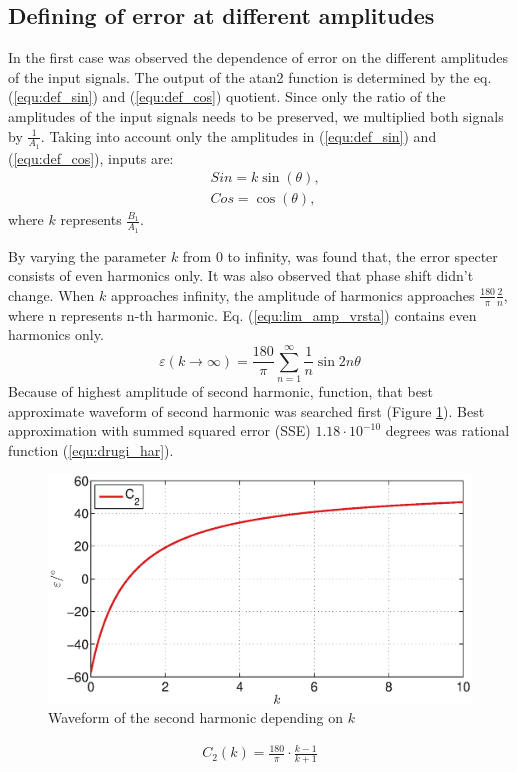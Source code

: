\documentclass[a4paper]{article}
\begin{document}
\subsection{Defining of error at different amplitudes}
In the first case was observed the dependence of error on the different amplitudes of the input signals. The output of the atan2 function is determined by the eq. (\ref{equ:def_sin}) and (\ref{equ:def_cos}) quotient. Since only the ratio of the amplitudes of the input signals needs to be preserved, we multiplied both signals by $\frac{1}{A_1}$. Taking into account only the amplitudes in (\ref{equ:def_sin}) and (\ref{equ:def_cos}), inputs are:
	\begin{eqnarray}
	\label{equ:def_sin_ama}
	&Sin = k \sin(\theta),\\
	\label{equ:def_cos_amp}
	&Cos =\cos(\theta),
	\end{eqnarray}
where $k$ represents $\frac{B_1}{A_1}$.

By varying the parameter $k$ from 0 to infinity, was found that, the error specter consists of even harmonics only. It was also observed that phase shift didn't change. When $k$ approaches infinity, the amplitude of harmonics approaches $\frac{180}{\pi}\frac{2}{n}$, where n represents n-th harmonic. Eq. (\ref{equ:lim_amp_vrsta}) contains even harmonics only.
\begin{equation}
\label{equ:lim_amp_vrsta}
\varepsilon(k \rightarrow \infty) = \frac{180}{\pi}\sum_{n=1}^{\infty}\frac{1}{n} \sin 2 n \theta
\end{equation}
Because of highest amplitude of second harmonic, function, that best approximate waveform of second harmonic was searched first (Figure \ref{fig:amp}).
Best approximation with summed squared error (SSE) $1.18 \cdot 10^{-10}$ degrees was rational function (\ref{equ:drugi_har}).

\begin{figure}[!htb]
	\begin{center}
		\includegraphics[width=\linewidth]{./Slike/amp.eps}
		\caption{Waveform of the second harmonic depending on $k$} \label{fig:amp}
	\end{center}
\end{figure}
\begin{eqnarray}
\label{equ:drugi_har}
C_2(k)=\frac{180}{\pi}\cdot\frac{k-1}{k+1}
\end{eqnarray}
\end{document}
